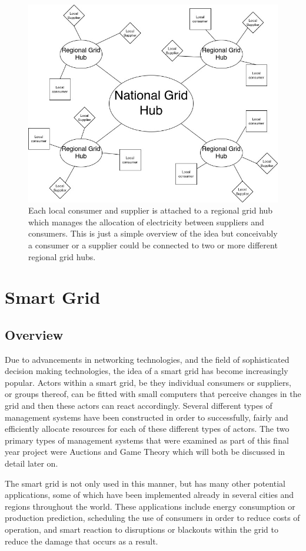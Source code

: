 \documentclass[a4paper, notitlepage]{report}
\begin{document}
\begin{figure}[htbp]
\centering
\includegraphics[width=.9\linewidth]{./img/DecentralisedGrid.jpg}
\caption{\label{fig:org187f761}
Each local consumer and supplier is attached to a regional grid hub which manages the allocation of electricity between suppliers and consumers. This is just a simple overview of the idea but conceivably a consumer or a supplier could be connected to two or more different regional grid hubs.}
\end{figure}
\chapter{Smart Grid}
\label{sec:orge917ad9}
\section{Overview}
\label{sec:org868cbe5}
Due to advancements in networking technologies, and the field of sophisticated
decision making technologies, the idea of a smart grid has become increasingly
popular. Actors within a smart grid, be they individual consumers or suppliers,
or groups thereof, can be fitted with small computers that perceive changes in
the grid and then these actors can react accordingly. Several different types of
management systems have been constructed in order to successfully, fairly and
efficiently allocate resources for each of these different types of actors. The
two primary types of management systems that were examined as part of this final
year project were Auctions and Game Theory which will both be discussed in
detail later on. 

The smart grid is not only used in this manner, but has many other potential
applications, some of which have been implemented already in several cities and
regions throughout the world. These applications include energy consumption or
production prediction, scheduling the use of consumers in order to reduce costs
of operation, and smart reaction to disruptions or blackouts within the grid to
reduce the damage that occurs as a result. 
\end{document}
